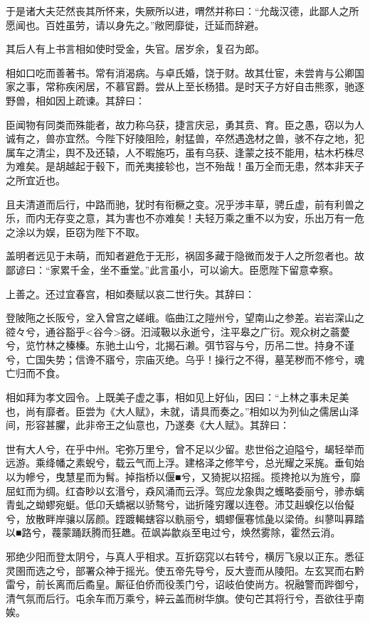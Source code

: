 \documentclass[]{article}
\begin{document}
于是诸大夫茫然丧其所怀来，失厥所以进，喟然并称曰：``允哉汉德，此鄙人之所愿闻也。百姓虽劳，请以身先之。''敞罔靡徙，迁延而辞避。

其后人有上书言相如使时受金，失官。居岁余，复召为郎。

相如口吃而善著书。常有消渴病。与卓氏婚，饶于财。故其仕宦，未尝肯与公卿国家之事，常称疾闲居，不慕官爵。尝从上至长杨猎。是时天子方好自击熊豕，驰逐野兽，相如因上疏谏。其辞曰：

臣闻物有同类而殊能者，故力称乌获，捷言庆忌，勇其贲、育。臣之愚，窃以为人诚有之，兽亦宜然。今陛下好陵阻险，射猛兽，卒然遇逸材之兽，骇不存之地，犯属车之清尘，舆不及还辕，人不暇施巧，虽有乌获、逢蒙之技不能用，枯木朽株尽为难矣。是胡越起于毂下，而羌夷接轸也，岂不殆哉！虽万全而无患，然本非天子之所宜近也。

且夫清道而后行，中路而驰，犹时有衔橛之变。况乎涉丰草，骋丘虚，前有利兽之乐，而内无存变之意，其为害也不亦难矣！夫轻万乘之重不以为安，乐出万有一危之涂以为娱，臣窃为陛下不取。

盖明者远见于未萌，而知者避危于无形，祸固多藏于隐微而发于人之所忽者也。故鄙谚曰：``家累千金，坐不垂堂。''此言虽小，可以谕大。臣愿陛下留意幸察。

上善之。还过宜春宫，相如奏赋以哀二世行失。其辞曰：

登陂陁之长阪兮，坌入曾宫之嵯峨。临曲江之隑州兮，望南山之参差。岩岩深山之谾々兮，通谷豁乎\textless{}谷今\textgreater{}谺。汨淢靸以永逝兮，注平皋之广衍。观众树之蓊薆兮，览竹林之榛榛。东驰土山兮，北揭石濑。弭节容与兮，历吊二世。持身不谨兮，亡国失势；信谗不寤兮，宗庙灭绝。乌乎！操行之不得，墓芜秽而不修兮，魂亡归而不食。

相如拜为孝文园令。上既美子虚之事，相如见上好仙，因曰：``上林之事未足美也，尚有靡者。臣尝为《大人赋》，未就，请具而奏之。''相如以为列仙之儒居山泽间，形容甚臞，此非帝王之仙意也，乃遂奏《大人赋》。其辞曰：

世有大人兮，在乎中州。宅弥万里兮，曾不足以少留。悲世俗之迫隘兮，朅轻举而远游。乘绛幡之素蜺兮，载云气而上浮。建格泽之修竿兮，总光耀之采旄。垂旬始以为幓兮，曳慧星而为髾。掉指桥以偃■兮，又猗抳以招摇。揽搀抢以为旌兮，靡屈虹而为绸。红杳眇以玄湣兮，猋风涌而云浮。驾应龙象舆之蠖略委丽兮，骖赤螭青虬之蚴蟉宛蜓。低卬夭蟜裾以骄骜兮，诎折隆穷躩以连卷。沛艾赳螑仡以佁儗兮，放散畔岸骧以孱颜。跮踱輵螛容以骫丽兮，蜩蟉偃寋怵彘以梁倚。纠蓼叫奡踏以■路兮，薎蒙踊跃腾而狂趭。莅飒芔歙焱至电过兮，焕然雾除，霍然云消。

邪绝少阳而登太阴兮，与真人乎相求。互折窈窕以右转兮，横厉飞泉以正东。悉征灵圉而选之兮，部署众神于摇光。使五帝先导兮，反大壹而从陵阳。左玄冥而右黔雷兮，前长离而后矞皇。厮征伯侨而役羡门兮，诏岐伯使尚方。祝融警而跸御兮，清气氛而后行。屯余车而万乘兮，綷云盖而树华旗。使句芒其将行兮，吾欲往乎南娭。
\end{document}
